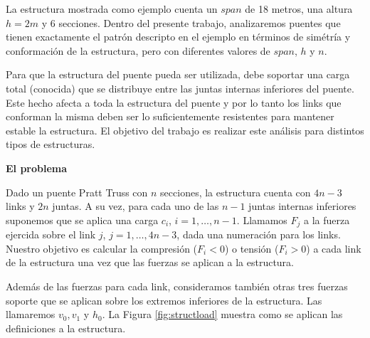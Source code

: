 \noindent La estructura mostrada como ejemplo cuenta un $span$ de 18 metros, una altura $h = 2m$ y 6 secciones. Dentro
del presente trabajo, analizaremos puentes que tienen exactamente el patr\'on descripto en el ejemplo en t\'erminos
de sim\'etr\'ia y conformaci\'on de la estructura, pero con diferentes valores de $span$, $h$ y $n$.

Para que la estructura del puente pueda ser utilizada, debe soportar una carga total (conocida) que se distribuye entre 
las juntas internas inferiores del puente. Este hecho afecta a toda la estructura del puente y por lo tanto los links
que conforman la misma deben ser lo suficientemente resistentes para mantener estable la estructura. El objetivo del
trabajo es realizar este an\'alisis para distintos tipos de estructuras.

\textbf{El problema}

Dado un puente Pratt Truss con $n$ secciones, la estructura cuenta con $4n-3$ links y $2n$ juntas. A su vez, para cada
uno de las $n-1$ juntas internas inferiores suponemos que se aplica una carga $c_i$, $i = 1,\dots,n-1$. Llamamos $F_j$ a
la fuerza ejercida sobre el link $j$, $j = 1,\dots,4n-3$, dada una numeraci\'on para los links. Nuestro objetivo es
calcular la compresi\'on ($F_i < 0$) o tensi\'on ($F_i > 0$) a cada link de la estructura una vez que las fuerzas se
aplican a la estructura. 

Adem\'as de las fuerzas para cada link, consideramos tambi\'en otras tres fuerzas soporte que se aplican sobre los extremos
inferiores de la estructura. Las llamaremos $v_0, v_1$ y $h_0$. La Figura \ref{fig:structload} muestra como se aplican
las definiciones a la estructura.

